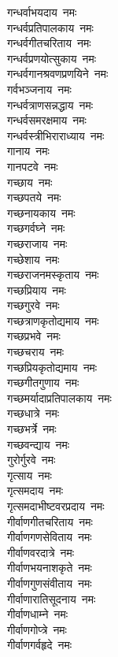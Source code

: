 \begin{multicols}{2}
\begin{flushleft}
गन्धर्वाभयदाय~नमः\hfill{}\\
गन्धर्वप्रतिपालकाय~नमः\\
गन्धर्वगीतचरिताय~नमः\\
गन्धर्वप्रणयोत्सुकाय~नमः\\
गन्धर्वगानश्रवणप्रणयिने~नमः\\
गर्वभञ्जनाय~नमः\\
गन्धर्वत्राणसन्नद्धाय~नमः\\
गन्धर्वसमरक्षमाय~नमः\\
गन्धर्वस्त्रीभिराराध्याय~नमः\\
गानाय~नमः\\
गानपटवे~नमः\hfill{}\\
गच्छाय~नमः\\
गच्छपतये~नमः\\
गच्छनायकाय~नमः\\
गच्छगर्वघ्ने~नमः\\
गच्छराजाय~नमः\\
गच्छेशाय~नमः\\
गच्छराजनमस्कृताय~नमः\\
गच्छप्रियाय~नमः\\
गच्छगुरवे~नमः\\
गच्छत्राणकृतोद्यमाय~नमः\hfill{}\\
गच्छप्रभवे~नमः\\
गच्छचराय~नमः\\
गच्छप्रियकृतोद्यमाय~नमः\\
गच्छगीतगुणाय~नमः\\
गच्छमर्यादाप्रतिपालकाय~नमः\\
गच्छधात्रे~नमः\\
गच्छभर्त्रे~नमः\\
गच्छवन्द्याय~नमः\\
गुरोर्गुरवे~नमः\\
गृत्साय~नमः\hfill{}\\
गृत्समदाय~नमः\\
गृत्समदाभीष्टवरप्रदाय~नमः\\
गीर्वाणगीतचरिताय~नमः\\
गीर्वाणगणसेविताय~नमः\\
गीर्वाणवरदात्रे~नमः\\
गीर्वाणभयनाशकृते~नमः\\
गीर्वाणगुणसंवीताय~नमः\\
गीर्वाणारातिसूदनाय~नमः\\
गीर्वाणधाम्ने~नमः\\
गीर्वाणगोप्त्रे~नमः\hfill{}\\
गीर्वाणगर्वहृदे~नमः\\

\end{flushleft}
\end{multicols}
